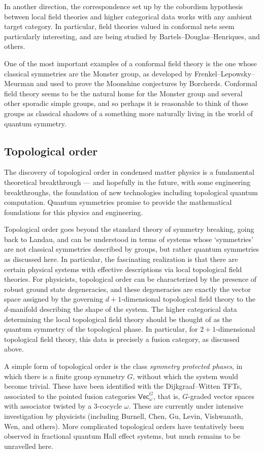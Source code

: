 \documentclass[12pt]{article}
\begin{document}
In another direction, the correspondence set up by the cobordism hypothesis between local field theories and higher categorical data works with any ambient target category. In particular, field theories valued in conformal nets seem particularly interesting, and are being studied by Bartels--Douglas--Henriques, and others.

One of the most important examples of a conformal field theory is the one whose classical symmetries are the Monster group, as developed by Frenkel--Lepowsky--Meurman and used to prove the Moonshine conjectures by Borcherds. Conformal field theory seems to be the natural home for the Monster group and several other sporadic simple groups, and so perhaps it is reasonable to think of those groups as classical  shadows of a something more naturally living in the world of quantum symmetry.

\subsection{Topological order}
The discovery of topological order in condensed matter physics is a
fundamental theoretical breakthrough --- and hopefully in the future, with
some engineering breakthroughs, the foundation of new technologies including
topological quantum computation. Quantum symmetries promise to provide the
mathematical foundations for this physics and engineering.

Topological order goes beyond the standard theory of symmetry breaking, going
back to Landau, and can be understood in terms of systems whose `symmetries'
are not classical symmetries described by groups, but rather quantum
symmetries as discussed here. In particular, the fascinating realization is
that there are certain physical systems with effective descriptions via local
topological field theories. For physicists, topological order can be
characterized by the presence of robust ground state degeneracies, and these
degeneracies are exactly the vector space assigned by the governing
$d+1$-dimensional topological field theory to the $d$-manifold describing the
shape of the system. The higher categorical data determining the local
topological field theory should be thought of as the quantum symmetry of the
topological phase. In particular, for $2+1$-dimensional topological field
theory, this data is precisely a fusion category, as discussed above.

A simple form of topological order is the class \emph{symmetry protected phases}, in which there is a finite group symmetry $G$, without which the system would become trivial. These have been identified with the Dijkgraaf--Witten TFTs, associated to the pointed fusion categories $\mathsf{Vec}_\omega^G$, that is, $G$-graded vector spaces with associator twisted by a 3-cocycle $\omega$. These are currently under intensive investigation by physicists (including Burnell, Chen, Gu, Levin, Vishwanath, Wen, and others). More complicated topological orders have tentatively been observed in fractional quantum Hall effect systems, but much remains to be unravelled here.
\end{document}
